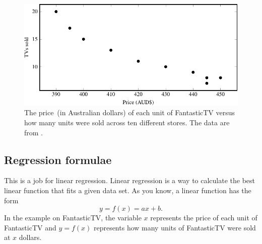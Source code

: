 \documentclass[a4paper,oneside,12pt]{article}
\begin{document}
\begin{figure}[!htbp]
\centering
\includegraphics[scale=1]{image/07/fantastic-tv-scatterplot.pdf}
\caption{%
  The price~(in Australian dollars) of each unit of FantasticTV versus
  how many units were sold across ten different stores.  The data are
  from .
}
\label{fig:tv_sold}
\end{figure}



\subsection*{Regression formulae}

This is a job for linear regression.  Linear regression is a way to
calculate the best linear function that fits a given data set.  As you
know, a linear function has the form
\[
y
=
f(x)
=
ax + b.
\]
In the example on FantasticTV, the variable $x$ represents the price
of each unit of FantasticTV and $y = f(x)$ represents how many units
of FantasticTV were sold at $x$ dollars.
\end{document}
